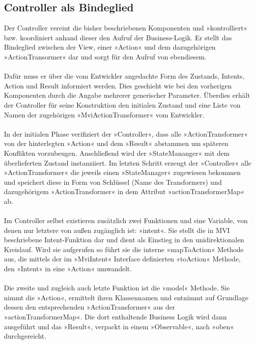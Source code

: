 \subsection{Controller als Bindeglied}
Der Controller vereint die bisher beschriebenen Komponenten und »kontrolliert« bzw. koordiniert anhand dieser den Aufruf der Business-Logik. Er stellt das Bindeglied zwischen der View, einer »Action« und dem dazugehörigen »ActionTransormer« dar und sorgt für den Aufruf von ebendiesem. 
\\\\
Dafür muss er über die vom Entwickler angedachte Form des Zustands, Intents, Action und Result informiert werden. Dies geschieht wie bei den vorherigen Komponenten durch die Angabe mehrerer generischer Parameter. Überdies erhält der Controller für seine Konstruktion den initialen Zustand und eine Liste von Namen der zugehörigen »MviActionTransformer« vom Entwickler.
\\\\
In der initialen Phase verifiziert der »Controller«, dass alle »ActionTransformer« von der hinterlegten »Action« und dem »Result« abstammen um späteren Konflikten vorzubeugen. Anschließend wird der »StateMananger« mit dem überlieferten Zustand instanziiert. Im letzten Schritt erzeugt der »Controller« alle »ActionTransformer« die jeweils einen »StateManager« zugewiesen bekommen und speichert diese in Form von Schlüssel (Name des Transformers) und dazugehörigem »ActionTransformer« in dem Attribut »actionTransformerMap« ab.
\\\\
Im Controller selbst existieren zusätzlich zwei Funktionen und eine Variable, von denen nur letztere von außen zugänglich ist: »intent«. Sie stellt die in MVI beschriebene Intent-Funktion dar und dient als Einstieg in den unidirektionalen Kreislauf. Wird sie aufgerufen so führt sie die interne »mapToAction« Methode aus, die mittels der im »MviIntent« Interface definierten »toAction« Methode, den »Intent« in eine »Action« umwandelt.
\\\\
Die zweite und zugleich auch letzte Funktion ist die »model« Methode. Sie nimmt die »Action«, ermittelt ihren Klassennamen und entnimmt auf Grundlage dessen den entsprechenden »ActionTransformer« aus der »actionTransformerMap«. Die dort enthaltende Business Logik wird dann ausgeführt und das »Result«, verpackt in einem »Observable«, nach »oben« durchgereicht.
